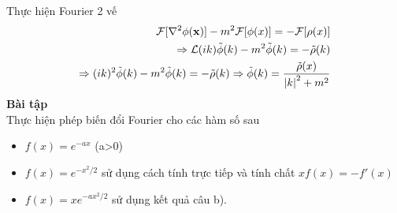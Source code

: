\documentclass{article}
\newcommand{\f}[2]{\dfrac{#1}{#2}}
\newcommand{\ft}[1]{\mathcal{F}[#1]}
\begin{document}
Thực hiện Fourier 2 vế
\begin{equation}
	\begin{aligned}
		\ft{\nabla^{2} \phi(\mathbf{x})} - m^{2} \ft{\phi(x)} = - \ft{\rho(x)}                  \\
		\Rightarrow \mathcal{L}(ik) \tilde{\phi}(k) - m^{2} \tilde{\phi}(k) = - \tilde{\rho}(k) \\
		\Rightarrow (ik)^{2} \tilde{\phi}(k) - m^{2} \tilde{\phi}(k) = - \tilde{\rho}(k)
		\Rightarrow \tilde{\phi}(k) = \f{\tilde{\rho}(x)}{\abs{k}^{2} + m^{2}}
	\end{aligned}
\end{equation}
\textbf{Bài tập}\\
Thực hiện phép biến đổi Fourier cho các hàm số sau
\begin{itemize}
	\item[a)] $f(x) = e^{-ax}$ (a>0)
	\item[b)] $f(x) = e^{-x^{2} / 2}$ sử dụng cách tính trực tiếp và tính chất $x f(x) = - f'(x)$
	\item[c)] $f(x) = x e^{-ax^{2} /2}$ sử dụng kết quả câu b).
\end{itemize}
\end{document}

